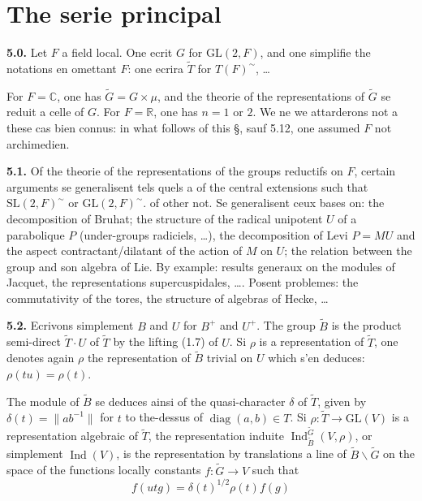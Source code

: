 \documentclass[12pt,a4paper]{article}
\theoremstyle{plain}
\theoremstyle{definition}
\theoremstyle{remark}
\DeclareMathOperator{\Ind}{Ind}
\DeclareMathOperator{\diag}{diag}
\newcommand{\CC}{\mathbb{C}}
\newcommand{\RR}{\mathbb{R}}
\newcommand{\wt}{\widetilde}
\providecommand{\CC}{\mathbb{C}}
\providecommand{\RR}{\mathbb{R}}
\begin{document}
\section{The serie principal}

\textbf{5.0.} Let $F$ a field local. One ecrit $G$ for $\mathrm{GL}(2, F)$, and one simplifie the notations en omettant $F$: one ecrira $\wt{T}$ for $T(F)^\sim$, \ldots

For $F = \CC$, one has $\wt{G} = G \times \mu$, and the theorie of the representations of $\wt{G}$ se reduit a celle of $G$. For $F = \RR$, one has $n = 1$ or $2$. We ne we attarderons not a these cas bien connus: in what follows of this \S, sauf 5.12, one assumed $F$ not archimedien.

\textbf{5.1.} Of the theorie of the representations of the groups reductifs on $F$, certain arguments se generalisent tels quels a of the central extensions such that $\mathrm{SL}(2, F)^\sim$ or $\mathrm{GL}(2, F)^\sim$. of other not. Se generalisent ceux bases on: the decomposition of Bruhat; the structure of the radical unipotent $U$ of a parabolique $P$ (under-groups radiciels, \ldots), the decomposition of Levi $P = MU$ and the aspect contractant/dilatant of the action of $M$ on $U$; the relation between the group and son algebra of Lie. By example: results generaux on the modules of Jacquet, the representations supercuspidales, \ldots. Posent problemes: the commutativity of the tores, the structure of algebras of Hecke, \ldots

\textbf{5.2.} Ecrivons simplement $B$ and $U$ for $B^+$ and $U^+$. The group $\wt{B}$ is the product semi-direct $\wt{T} \cdot U$ of $\wt{T}$ by the lifting (1.7) of $U$. Si $\rho$ is a representation of $\wt{T}$, one denotes again $\rho$ the representation of $\wt{B}$ trivial on $U$ which s'en deduces: $\rho(tu) = \rho(t)$.

The module of $\wt{B}$ se deduces ainsi of the quasi-character $\delta$ of $\wt{T}$, given by $\delta(t) = \|ab^{-1}\|$ for $t$ to the-dessus of $\diag(a, b) \in T$. Si $\rho : \wt{T} \to \mathrm{GL}(V)$ is a representation algebraic of $\wt{T}$, the representation induite $\Ind_{\wt{B}}^{\wt{G}}(V, \rho)$, or simplement $\Ind(V)$, is the representation by translations a line of $\wt{B} \backslash \wt{G}$ on the space of the functions locally constants $f : \wt{G} \to V$ such that
\begin{equation}\label{eq:5.2.1}
f(utg) = \delta(t)^{1/2} \rho(t) f(g)
\tag{5.2.1}
\end{equation}
\end{document}
